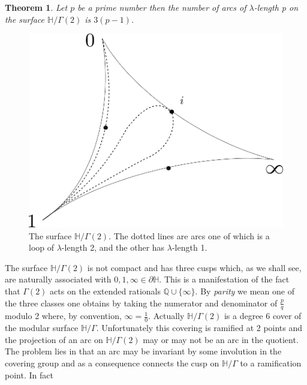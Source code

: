 \documentclass[12pt,a4paper]{amsart}
\newtheorem{thm}{Theorem}[section]
\def\HH{\mathbb{H}}
\def\g2{\Gamma(2)}
\def\xx{\HH/\g2}
\begin{document}
\begin{thm}\label{g2 arcs}
	Let $p$ be a prime number then the number of arcs of
	$\lambda$-length p on the surface
	$\xx$ is $3(p-1)$.
\end{thm}


 \begin{figure}[H]
\begin{center}
\includegraphics[scale=.3]{3sphere.png} 
\end{center}
\caption{The surface $\xx$. The dotted lines are arcs one of which
is a loop of $\lambda$-length 2, and the other has $\lambda$-length 1.}
\label{3sphere}
\end{figure}

The surface  $\xx$ is not compact and has three cusps which, as we
shall see, are naturally associated with $0,1,\infty \in \partial \mathbb{H}$.
This is a manifestation of the fact that $\g2$ acts on the extended
rationals $\mathbb{Q} \cup \{\infty\}$.
By \textit{parity} we mean one
of the three classes one obtains by taking the 
numerator and denominator of $\frac{p}{q}$ modulo 2
where, by convention, $\infty = \frac{1}{0}$.
Actually $\xx$ is a degree 6 cover of the modular surface
$\mathbb{H}/\Gamma$. 
Unfortunately this covering is ramified at 2 points and
the projection of an arc on $\xx$ may or may not be an arc in the
quotient.
The problem lies in that an arc may be invariant by some involution
in the covering group and as a consequence connects the cusp on
$\mathbb{H}/\Gamma$ to a ramification point.
In fact 
\end{document}
